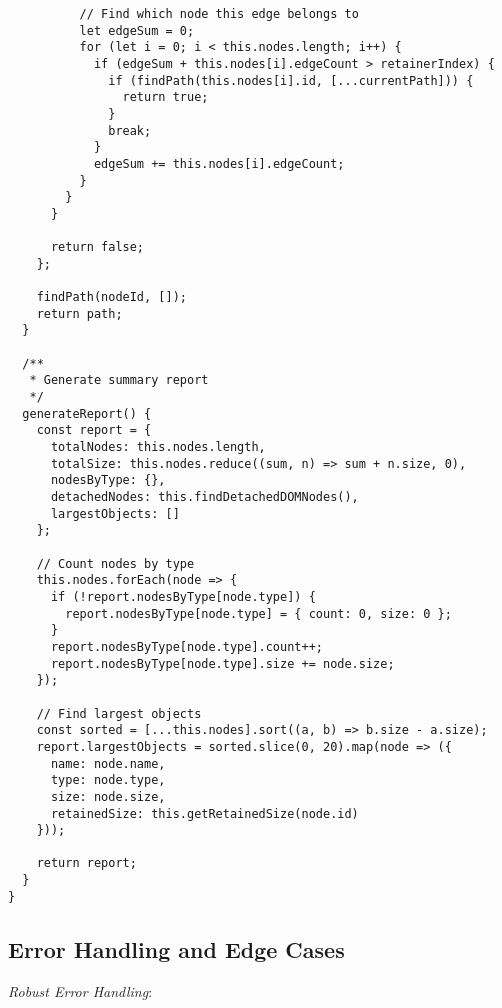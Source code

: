 \documentclass[11pt]{article}
\begin{document}
\begin{verbatim}
          // Find which node this edge belongs to
          let edgeSum = 0;
          for (let i = 0; i < this.nodes.length; i++) {
            if (edgeSum + this.nodes[i].edgeCount > retainerIndex) {
              if (findPath(this.nodes[i].id, [...currentPath])) {
                return true;
              }
              break;
            }
            edgeSum += this.nodes[i].edgeCount;
          }
        }
      }
      
      return false;
    };
    
    findPath(nodeId, []);
    return path;
  }
  
  /**
   * Generate summary report
   */
  generateReport() {
    const report = {
      totalNodes: this.nodes.length,
      totalSize: this.nodes.reduce((sum, n) => sum + n.size, 0),
      nodesByType: {},
      detachedNodes: this.findDetachedDOMNodes(),
      largestObjects: []
    };
    
    // Count nodes by type
    this.nodes.forEach(node => {
      if (!report.nodesByType[node.type]) {
        report.nodesByType[node.type] = { count: 0, size: 0 };
      }
      report.nodesByType[node.type].count++;
      report.nodesByType[node.type].size += node.size;
    });
    
    // Find largest objects
    const sorted = [...this.nodes].sort((a, b) => b.size - a.size);
    report.largestObjects = sorted.slice(0, 20).map(node => ({
      name: node.name,
      type: node.type,
      size: node.size,
      retainedSize: this.getRetainedSize(node.id)
    }));
    
    return report;
  }
}
\end{verbatim}
\subsection{Error Handling and Edge Cases}
\label{sec:org4101c02}

\emph{Robust Error Handling}:
\end{document}

